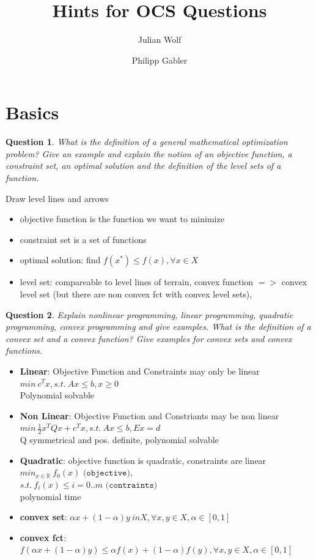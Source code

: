 \documentclass{article}
\title{Hints for OCS Questions}
\author{Julian Wolf \and Philipp Gabler}
\newtheorem{question}{Question}
\begin{document}
\maketitle

\section{Basics}

\begin{question}
  What is the definition of a general mathematical optimization problem?  Give an example and
  explain the notion of an objective function, a constraint set, an optimal solution and the
  definition of the level sets of a function.
\end{question}
Draw level lines and arrows
\begin{itemize}
\item objective function is the function we want to minimize
\item constraint set is a set of functions
\item optimal solution: find $f(x^*) \leq f(x), \forall x \in X$
\item level set: compareable to level lines of terrain, convex function $=>$ convex level set (but
  there are non convex fct with convex level sets),
\end{itemize}

\begin{question}
  Explain nonlinear programming, linear programming, quadratic programming, convex programming and
  give examples. What is the definition of a convex set and a convex function? Give examples for
  convex sets and convex functions.
\end{question}
\begin{itemize}
\item \textbf{Linear}: Objective Function and Constraints may only be linear
  $min\ c^Tx, s.t.\ Ax \leq b, x \geq 0$\\
  Polynomial solvable
\item \textbf{Non Linear}: Objective Function and Constriants may  be non linear
  $min\ \frac{1}{2} x^TQx + c^Tx, s.t.\ Ax \leq b, Ex = d$\\
  Q symmetrical and pos. definite, polynomial solvable
\item \textbf{Quadratic}: objective function is quadratic, constraints are linear	
  $min_{x \in \mathbb{R}}\ f_0(x) \texttt{ (objective)},$\\
  $s.t.\ f_i(x) \leq i=0..m \texttt{ (contraints)}$\\
  polynomial time
\item \textbf{convex set}: 
  $\alpha x + (1 - \alpha)y \ in X, \forall x, y \in X, \alpha \in [0, 1]$
\item \textbf{convex fct}:
  $f(\alpha x + (1 - \alpha)y) \leq \alpha f(x) + (1 - \alpha)f(y) , \forall x, y \in X, \alpha \in
  [0, 1]$
\end{itemize}
\end{document}

